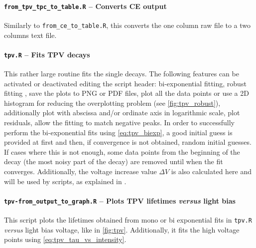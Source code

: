 		\paragraph{\texttt{from\_tpv\_tpc\_to\_table.R} -- Converts CE output}
		Similarly to \texttt{from\_ce\_to\_table.R}, this converts the one column raw file to a two columns text file.

		\paragraph{\texttt{tpv.R} -- Fits TPV decays}
		This rather large routine fits the single  decays.
		The following features can be activated or deactivated editing the script header:
		bi-exponential fitting, robust fitting \cite{Maechler2018}, save the plots to PNG or PDF files, plot all the data points or use a 2D histogram for reducing the overplotting problem (see \cref{fig:tpv_robust}), additionally plot with abscissa and/or ordinate axis in logarithmic scale, plot residuals, allow the fitting to match negative peaks.
		In order to successfully perform the bi-exponential fits using \cref{eq:tpv_biexp}, a good initial guess is provided at first and then, if convergence is not obtained, random initial guesses.
		If cases where this is not enough, some data points from the beginning of the decay (the most noisy part of the decay) are removed until when the fit converges.
		Additionally, the voltage increase value $\Delta V$ is also calculated here and will be used by  scripts, as explained in .

		\paragraph{\texttt{tpv-\-from\_output\_to\_graph.R} -- Plots TPV lifetimes \textsl{versus} light bias}
		This script plots the lifetimes obtained from mono or bi exponential fits in \texttt{tpv.R} \textsl{versus} light bias voltage, like in \cref{fig:tpv}.
		Additionally, it fits the high voltage points using \cref{eq:tpv_tau_vs_intensity}.
